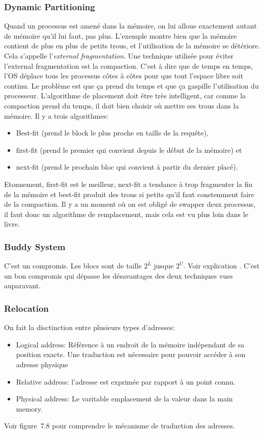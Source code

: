 \subsubsection{Dynamic Partitioning}
Quand un processus est amené dans la mémoire, on lui alloue exactement autant de mémoire qu'il lui faut, pas plus.
L'exemple \cite[p.~334]{stallings} montre bien que la mémoire contient de plus en plus de petits trous,
et l'utilisation de la mémoire se détériore.
Cela s'appelle l'\emph{external fragmentation}.
Une technique utilisée pour éviter l'external fragmentation est la compaction.
C'est à dire que de temps en temps, l'OS déplace tous les processus côtes à côtes pour que tout l'espace libre soit continu.
Le problème est que ça prend du temps et que ça gaspille l'utilisation du processeur.
L'algorithme de placement doit être très intelligent,
car comme la compaction prend du temps,
il doit bien choisir où mettre ses trous dans la mémoire.
Il y a trois algorithmes:
\begin{itemize}
  \item Best-fit (prend le block le plus proche en taille de la requête),
  \item first-fit (prend le premier qui convient depuis le début de la mémoire) et
  \item next-fit (prend le prochain bloc qui convient à partir du dernier placé).
\end{itemize}

Etonnement, first-fit est le meilleur,
next-fit a tendance à trop fragmenter la fin de la mémoire et best-fit produit des trous si petits qu'il faut constemment faire de la compaction.
Il y a un moment où on est obligé de swapper deux processus,
il faut donc un algorithme de remplacement,
mais cela est vu plus loin dans le livre.

\subsubsection{Buddy System}
C'est un compromis.
Les blocs sont de taille $2^L$ jusque $2^U$.
Voir explication \cite[p.~337-338]{stallings}.
C'est un bon compromis qui dépasse les désavantages des deux techniques vues auparavant.

\subsubsection{Relocation}
On fait la disctinction entre plusieurs types d'adresses:
\begin{itemize}
  \item Logical address: Référence à un endroit de la mémoire indépendant de sa position exacte.
    Une traduction est nécessaire pour pouvoir accéder à son adresse physique
  \item Relative address: l'adresse est exprimée par rapport à un point connu.
  \item Physical address: Le varitable emplacement de la valeur dans la main memory.
\end{itemize}
Voir figure~7.8 \cite[p.~340]{stallings} pour comprendre le mécanisme de traduction des adresses.

